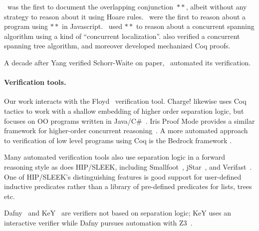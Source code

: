 \cite{rey-slnotes}~was the first to document the overlapping conjunction~$**$, albeit without
any strategy to reason about it using Hoare rules.
\cite{gardnerms12}~were the first to reason about a program using $**$ in
Javascript.  \cite{raadvg15}~used $**$ to reason about a
concurrent spanning algorithm using a kind of
``concurrent localization''.  \cite{ilya-graphs} also verified a
concurrent spanning tree algorithm, and moreover developed mechanized Coq proofs.

A decade after Yang verified Schorr-Waite on paper, \cite{leino10}~automated
its verification.


\vspace{-1ex}
\paragraph{Verification tools.}
Our work interacts with the Floyd~\cite{appel:programlogics} verification
tool.  Charge! likewise uses Coq tactics to work with a shallow embedding of higher
order separation logic, but focuses on OO programs written in
Java/C\#~\cite{bengtson:charge}.  Iris Proof Mode provides a similar framework for higher-order
concurrent reasoning~\cite{krebbers:iris}.  A  more automated approach to verification of low
level programs using Coq is the Bedrock framework \cite{chlipala:bedrock}.

Many automated verification tools also use separation logic in a forward reasoning style
as does HIP/SLEEK, including Smallfoot~\cite{berdine:smallfoot},
jStar~\cite{distefanop08}, and Verifast~\cite{jacobs:verifast}.  One of HIP/SLEEK's
distinguishing features is good support for user-defined inductive predicates rather
than a library of pre-defined predicates for lists, trees etc.

Dafny~\cite{leino10} and KeY~\cite{beckert:2007} are verifiers not based
on separation logic; KeY uses an interactive verifier while Dafny pursues automation with Z3~\cite{moura2008}.

